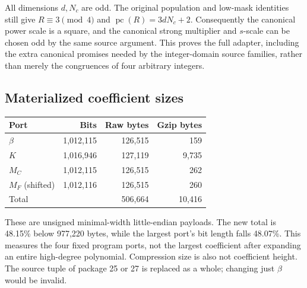 \documentclass[11pt]{article}
\newcommand{\pc}{\operatorname{pc}}
\begin{document}
All dimensions $d,N_c$ are odd. The original population and low-mask
identities still give $R\equiv3\pmod4$ and
$\pc(R)=3dN_c+2$. Consequently the canonical power scale is a square,
and the canonical strong multiplier and $s$-scale can be chosen odd by the
same source argument. This proves the full adapter, including the extra
canonical promises needed by the integer-domain source families, rather
than merely the congruences of four arbitrary integers.

\subsection{Materialized coefficient sizes}

\begin{center}
\begin{tabular}{@{}lrrr@{}}
\toprule
Port & Bits & Raw bytes & Gzip bytes\\
\midrule
$\beta$ & 1,012,115 & 126,515 & 159\\
$K$ & 1,016,946 & 127,119 & 9,735\\
$M_C$ & 1,012,115 & 126,515 & 262\\
$M_F$ (shifted) & 1,012,116 & 126,515 & 260\\
\midrule
Total & & 506,664 & 10,416\\
\bottomrule
\end{tabular}
\end{center}

These are unsigned minimal-width little-endian payloads. The new total is
48.15\% below 977,220 bytes, while the largest port's bit length falls
48.07\%. This measures the four fixed program ports, not the largest
coefficient after expanding an entire high-degree polynomial. Compression
size is also not coefficient height. The source tuple of package 25 or 27
is replaced as a whole; changing just $\beta$ would be invalid.



\end{document}
